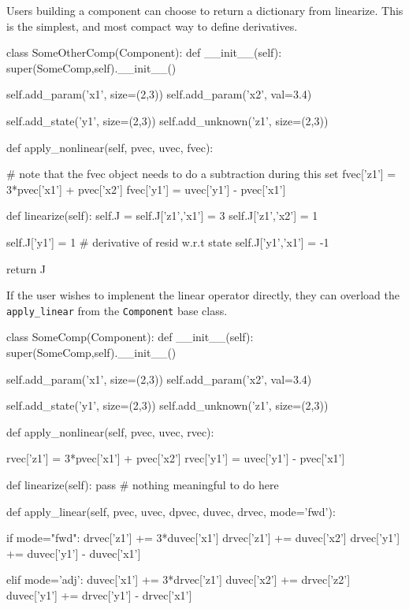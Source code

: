 \documentclass[12pt]{article}
\newcommand{\classname}[1]{\texttt{#1}}
\newcommand{\method}[1]{\texttt{#1}}
\begin{document}
Users building a component can choose to return a dictionary from linearize.
This is the simplest, and most compact way to define derivatives.

\begin{pyglist}[language=python]
    class SomeOtherComp(Component):
        def __init__(self):
            super(SomeComp,self).__init__()

            self.add_param('x1', size=(2,3))
            self.add_param('x2', val=3.4)

            self.add_state('y1', size=(2,3))
            self.add_unknown('z1', size=(2,3))

        def apply_nonlinear(self, pvec, uvec, fvec):

            # note that the fvec object needs to do a subtraction during this set
            fvec['z1'] = 3*pvec['x1'] + pvec['x2']
            fvec['y1'] = uvec['y1'] - pvec['x1']

        def linearize(self):
            self.J = {}
            self.J['z1','x1'] = 3
            self.J['z1','x2'] = 1

            self.J['y1'] = 1 # derivative of resid w.r.t state
            self.J['y1','x1'] = -1

            return J
\end{pyglist}

If the user wishes to implenent the linear operator directly, they can overload
the \method{apply\_linear} from the \classname{Component} base class.

\begin{pyglist}[language=python]
    class SomeComp(Component):
        def __init__(self):
            super(SomeComp,self).__init__()

            self.add_param('x1', size=(2,3))
            self.add_param('x2', val=3.4)

            self.add_state('y1', size=(2,3))
            self.add_unknown('z1', size=(2,3))

        def apply_nonlinear(self, pvec, uvec, rvec):

            rvec['z1'] = 3*pvec['x1'] + pvec['x2']
            rvec['y1'] = uvec['y1'] - pvec['x1']

        def linearize(self):
            pass # nothing meaningful to do here

        def apply_linear(self, pvec, uvec, dpvec, duvec, drvec, mode='fwd'):

            if mode="fwd":
                drvec['z1'] += 3*duvec['x1']
                drvec['z1'] += duvec['x2']
                drvec['y1'] += duvec['y1'] - duvec['x1']

            elif mode='adj':
                duvec['x1'] += 3*drvec['z1']
                duvec['x2'] += drvec['z2']
                duvec['y1'] += drvec['y1'] - drvec['x1']
\end{pyglist}
\end{document}
